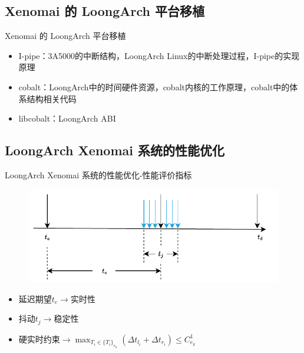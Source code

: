 \documentclass{beamer}
\begin{document}
\subsection{Xenomai 的 LoongArch 平台移植}

\begin{frame}{Xenomai 的 LoongArch 平台移植}
    \begin{itemize}
        \item I-pipe：3A5000的中断结构，LoongArch Linux的中断处理过程，I-pipe的实现原理
        \item cobalt：LoongArch中的时间硬件资源，cobalt内核的工作原理，cobalt中的体系结构相关代码
        \item libcobalt：LoongArch ABI
    \end{itemize}
\end{frame}

\subsection{LoongArch Xenomai 系统的性能优化}

\begin{frame}{LoongArch Xenomai 系统的性能优化-性能评价指标}
    \begin{figure}[!htbp]
        \includegraphics[width=\textwidth]{img/Img/jitter.pdf}
      \end{figure}
    \begin{itemize}
        \item 延迟期望$t_e\to$实时性
        \item 抖动$t_j\to$稳定性
        \item 硬实时约束$\to$$\max_{T_i\in\{T_i\}_{e_k}}{(\Delta t_{l_i} + \Delta t_{r_i})} \le C_{e_{k}}^1$
    \end{itemize}
\end{frame}
\end{document}
